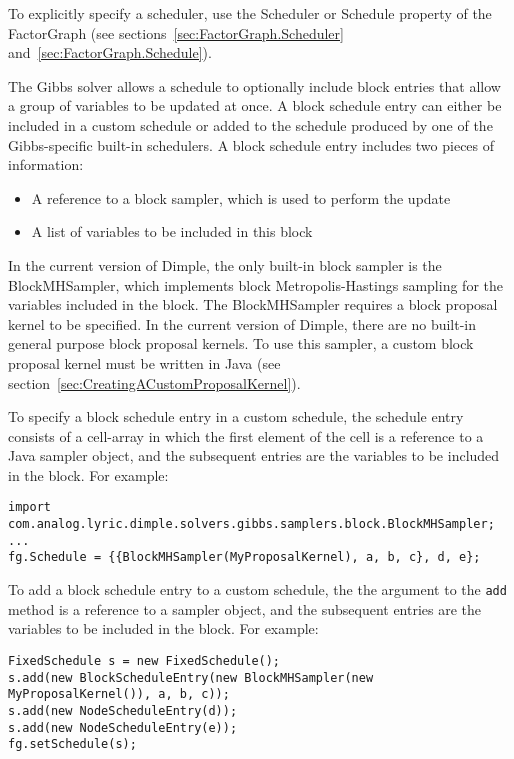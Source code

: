 To explicitly specify a scheduler, use the Scheduler or Schedule property of the FactorGraph (see sections~\ref{sec:FactorGraph.Scheduler} and~\ref{sec:FactorGraph.Schedule}).

\label{sec:BlockScheduleEntries}

The Gibbs solver allows a schedule to optionally include block entries that allow a group of variables to be updated at once.  A block schedule entry can either be included in a custom schedule or added to the schedule produced by one of the Gibbs-specific built-in schedulers.  A block schedule entry includes two pieces of information:
%
\begin{itemize}
\item A reference to a block sampler, which is used to perform the update
\item A list of variables to be included in this block
\end{itemize}

In the current version of Dimple, the only built-in block sampler is the BlockMHSampler, which implements block Metropolis-Hastings sampling for the variables included in the block.  The BlockMHSampler requires a block proposal kernel to be specified.  In the current version of Dimple, there are no built-in general purpose block proposal kernels.  To use this sampler, a custom block proposal kernel must be written \ifmatlab in Java \fi (see section~\ref{sec:CreatingACustomProposalKernel}).

\ifmatlab
To specify a block schedule entry in a custom schedule, the schedule entry consists of a cell-array in which the first element of the cell is a reference to a Java sampler object, and the subsequent entries are the variables to be included in the block.  For example:

\begin{lstlisting}
import com.analog.lyric.dimple.solvers.gibbs.samplers.block.BlockMHSampler;
...
fg.Schedule = {{BlockMHSampler(MyProposalKernel), a, b, c}, d, e};
\end{lstlisting}
\fi

\ifjava
To add a block schedule entry to a custom schedule, the the argument to the \texttt{add} method is a reference to a sampler object, and the subsequent entries are the variables to be included in the block.  For example:

\begin{lstlisting}
FixedSchedule s = new FixedSchedule();
s.add(new BlockScheduleEntry(new BlockMHSampler(new MyProposalKernel()), a, b, c));
s.add(new NodeScheduleEntry(d));
s.add(new NodeScheduleEntry(e));
fg.setSchedule(s);
\end{lstlisting}
\fi


